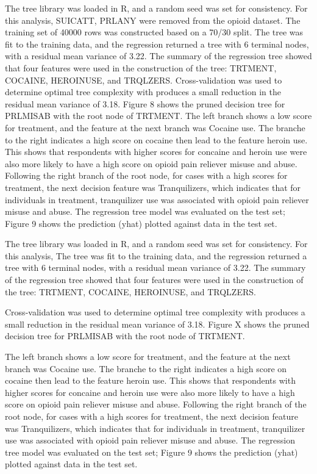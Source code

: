 \documentclass[sigconf]{acmart}
\begin{document}
The tree library was loaded in R, and a random seed was set for consistency. 
For this analysis, SUICATT, PRLANY were removed from the opioid dataset. The 
training set of 40000 rows was constructed based on a 70/30 split. The tree
was fit to the training data, and the regression returned a tree with 6
terminal nodes, with a residual mean variance of 3.22. The summary of the 
regression tree showed that four features were used in the construction of 
the tree: TRTMENT, COCAINE, HEROINUSE, and TRQLZERS. Cross-validation 
was used to determine optimal tree complexity with produces a small reduction
in the residual mean variance of 3.18. Figure 8 shows the pruned decision tree 
for PRLMISAB with the root node of TRTMENT. The left branch shows a low 
score for treatment, and the feature at the next branch was Cocaine use. 
The branche to the right indicates a high score on cocaine then lead to 
the feature heroin use. This shows that respondents with higher scores for 
concaine and heroin use were also more likely to have a high score on 
opioid pain reliever misuse and abuse. Following the right branch of the 
root node, for cases with a high scores for treatment, the next decision 
feature was Tranquilizers, which indicates that for individuals in treatment, 
tranquilizer use was associated with opioid pain reliever misuse and abuse. 
The regression tree model was evaluated on the test set; Figure 9 shows 
the prediction (yhat) plotted against data in the test set.


The tree library was loaded in R, and a random seed was set for consistency. 
For this analysis, The tree was fit to the training data, and the regression 
returned a tree with 6 terminal nodes, with a residual mean variance of 3.22. 
The summary of the regression tree showed that four features were used in the 
construction of the tree: TRTMENT, COCAINE, HEROINUSE, and TRQLZERS. 

Cross-validation was used to determine optimal tree complexity with produces 
a small reduction in the residual mean variance of 3.18. Figure X shows the 
pruned decision tree for PRLMISAB with the root node of TRTMENT. 

The left branch shows a low 
score for treatment, and the feature at the next branch was Cocaine use. 
The branche to the right indicates a high score on cocaine then lead to 
the feature heroin use. This shows that respondents with higher scores for 
concaine and heroin use were also more likely to have a high score on 
opioid pain reliever misuse and abuse. Following the right branch of the 
root node, for cases with a high scores for treatment, the next decision 
feature was Tranquilizers, which indicates that for individuals in treatment, 
tranquilizer use was associated with opioid pain reliever misuse and abuse. 
The regression tree model was evaluated on the test set; Figure 9 shows 
the prediction (yhat) plotted against data in the test set.
\end{document}

